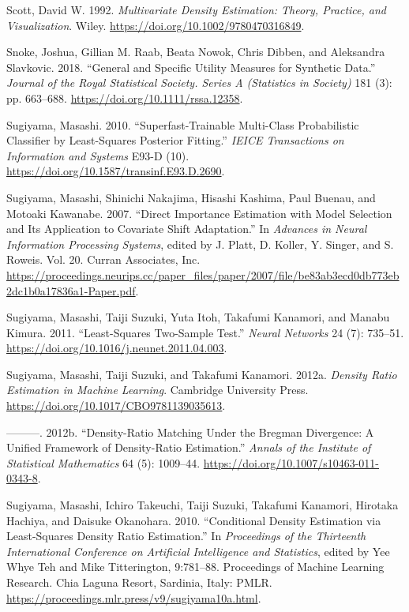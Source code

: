 \documentclass[
]{article}
\newlength{\cslhangindent}
\newenvironment{CSLReferences}[2] %
 {\begin{list}{}{%
  \setlength{\itemindent}{0pt}
  \setlength{\leftmargin}{0pt}
  \setlength{\parsep}{0pt}
  \ifodd #1
   \setlength{\leftmargin}{\cslhangindent}
   \setlength{\itemindent}{-1\cslhangindent}
  \fi
  \setlength{\itemsep}{#2\baselineskip}}}
 {\end{list}}
\begin{document}
\begin{CSLReferences}{1}{0}
Scott, David W. 1992. \emph{Multivariate Density Estimation: Theory,
Practice, and Visualization}. Wiley.
\url{https://doi.org/10.1002/9780470316849}.

Snoke, Joshua, Gillian M. Raab, Beata Nowok, Chris Dibben, and
Aleksandra Slavkovic. 2018. {``General and Specific Utility Measures for
Synthetic Data.''} \emph{Journal of the Royal Statistical Society.
Series A (Statistics in Society)} 181 (3): pp. 663--688.
\url{https://doi.org/10.1111/rssa.12358}.

Sugiyama, Masashi. 2010. {``Superfast-Trainable Multi-Class
Probabilistic Classifier by Least-Squares Posterior Fitting.''}
\emph{IEICE Transactions on Information and Systems} E93-D (10).
\url{https://doi.org/10.1587/transinf.E93.D.2690}.

Sugiyama, Masashi, Shinichi Nakajima, Hisashi Kashima, Paul Buenau, and
Motoaki Kawanabe. 2007. {``Direct Importance Estimation with Model
Selection and Its Application to Covariate Shift Adaptation.''} In
\emph{Advances in Neural Information Processing Systems}, edited by J.
Platt, D. Koller, Y. Singer, and S. Roweis. Vol. 20. Curran Associates,
Inc.
\url{https://proceedings.neurips.cc/paper_files/paper/2007/file/be83ab3ecd0db773eb2dc1b0a17836a1-Paper.pdf}.

Sugiyama, Masashi, Taiji Suzuki, Yuta Itoh, Takafumi Kanamori, and
Manabu Kimura. 2011. {``Least-Squares Two-Sample Test.''} \emph{Neural
Networks} 24 (7): 735--51.
\url{https://doi.org/10.1016/j.neunet.2011.04.003}.

Sugiyama, Masashi, Taiji Suzuki, and Takafumi Kanamori. 2012a.
\emph{Density Ratio Estimation in Machine Learning}. Cambridge
University Press. \url{https://doi.org/10.1017/CBO9781139035613}.

---------. 2012b. {``Density-Ratio Matching Under the Bregman
Divergence: A Unified Framework of Density-Ratio Estimation.''}
\emph{Annals of the Institute of Statistical Mathematics} 64 (5):
1009--44. \url{https://doi.org/10.1007/s10463-011-0343-8}.

Sugiyama, Masashi, Ichiro Takeuchi, Taiji Suzuki, Takafumi Kanamori,
Hirotaka Hachiya, and Daisuke Okanohara. 2010. {``Conditional Density
Estimation via Least-Squares Density Ratio Estimation.''} In
\emph{Proceedings of the Thirteenth International Conference on
Artificial Intelligence and Statistics}, edited by Yee Whye Teh and Mike
Titterington, 9:781--88. Proceedings of Machine Learning Research. Chia
Laguna Resort, Sardinia, Italy: PMLR.
\url{https://proceedings.mlr.press/v9/sugiyama10a.html}.


\end{CSLReferences}
\end{document}
